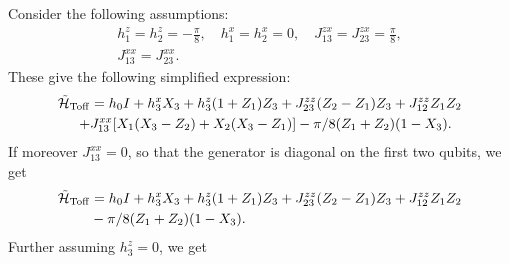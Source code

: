 Consider the following assumptions:
\begin{equation}
\begin{gathered}
  h_1^z = h_2^z = -\frac{\pi}{8},\quad
  h_1^x = h_2^x = 0,
  \quad J_{13}^{zx} = J_{23}^{zx} = \frac{\pi}{8}, \\
  J_{13}^{xx} = J_{23}^{xx}.
\end{gathered}
\end{equation}
These give the following simplified expression:
\begin{equation}
\begin{aligned}
  \tilde{{\mathcal{H}}}_{\operatorname{Toff}} &= h_0 I + h_3^x X_3 + h_3^z(1+ Z_1)Z_3
  + J_{23}^{zz}(Z_2 - Z_1)Z_3 + J_{12}^{zz} Z_1 Z_2 \\
  + &J_{13}^{xx} [X_1(X_3 - Z_2) + X_2(X_3 - Z_1)]
  - \pi/8 ( Z_1 +  Z_2)(1 - X_3).
\end{aligned}
\end{equation}
If moreover $J_{13}^{xx}=0$, so that the generator is diagonal on the first two qubits, we get
\begin{equation}
\begin{aligned}
    \tilde{{\mathcal{H}}}_{\operatorname{Toff}} &= h_0 I + h_3^x X_3 + h_3^z(1+ Z_1)Z_3
    + J_{23}^{zz}(Z_2 - Z_1)Z_3 + J_{12}^{zz} Z_1 Z_2\\
    &- \pi/8 (Z_1 +  Z_2)(1 - X_3).
\end{aligned}
\end{equation}
Further assuming $h_3^z=0$, we get
